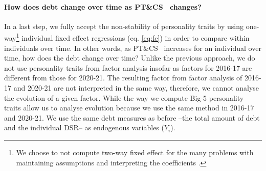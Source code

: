 \documentclass[a4paper, 11pt, onecolumn]{article}
\newcommand{\PTCS}{PT\&CS}
\begin{document}



\paragraph{How does debt change over time as \PTCS~ changes?}
In a last step, we fully accept the non-stability of personality traits by using one-way\footnote{We choose to not compute two-way fixed effect for the many problems with maintaining assumptions and interpreting the coefficients \citep{Kropko2020,Imai2020}.} individual fixed effect regressions (eq. \ref{eq:fe}) in order to compare within individuals over time.
In other words, as \PTCS~ increases for an individual over time, how does the debt change over time?
Unlike the previous approach, we do not use personality traits from factor analysis insofar as factors for 2016-17 are different from those for 2020-21.
The resulting factor from factor analysis of 2016-17 and 2020-21 are not interpreted in the same way, therefore, we cannot analyse the evolution of a given factor.
While the way we compute Big-5 personality traits allow us to analyse evolution because we use the same method in 2016-17 and 2020-21.
We use the same debt measures as before --the total amount of debt and the individual DSR-- as endogenous variables ($Y_{i}$). 
\end{document}
